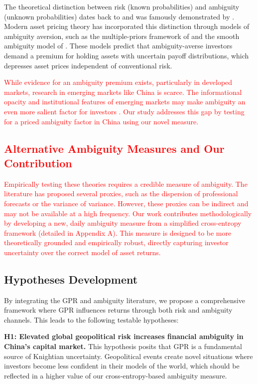 \documentclass[preprint,12pt,authoryear]{elsarticle}
\begin{document}
The theoretical distinction between risk (known probabilities) and ambiguity (unknown probabilities) dates back to \citet{Knight1921} and was famously demonstrated by \citet{Ellsberg1961}. Modern asset pricing theory has incorporated this distinction through models of ambiguity aversion, such as the multiple-priors framework of \citet{Gilboa1989} and the smooth ambiguity model of \citet{Klibanoff2005}. These models predict that ambiguity-averse investors demand a premium for holding assets with uncertain payoff distributions, which depresses asset prices independent of conventional risk.

\textcolor{red}{While evidence for an ambiguity premium exists, particularly in developed markets, research in emerging markets like China is scarce. The informational opacity and institutional features of emerging markets may make ambiguity an even more salient factor for investors \citep{Easley2009, Bekaert2014, Bali2020, Chen2021, Luo2022}. Our study addresses this gap by testing for a priced ambiguity factor in China using our novel measure.}

\textcolor{red}{\subsection{Alternative Ambiguity Measures and Our Contribution}}
\textcolor{red}{Empirically testing these theories requires a credible measure of ambiguity. The literature has proposed several proxies, such as the dispersion of professional forecasts \citep{Brenner2018, Ulrich2013} or the variance of variance. However, these proxies can be indirect and may not be available at a high frequency. Our work contributes methodologically by developing a new, daily ambiguity measure from a simplified cross-entropy framework (detailed in Appendix A). This measure is designed to be more theoretically grounded and empirically robust, directly capturing investor uncertainty over the correct model of asset returns.}

\subsection{Hypotheses Development}

By integrating the GPR and ambiguity literature, we propose a comprehensive framework where GPR influences returns through both risk and ambiguity channels. This leads to the following testable hypotheses:

\textbf{H1: Elevated global geopolitical risk increases financial ambiguity in China's capital market.}
This hypothesis posits that GPR is a fundamental source of Knightian uncertainty. Geopolitical events create novel situations where investors become less confident in their models of the world, which should be reflected in a higher value of our cross-entropy-based ambiguity measure.
\end{document}

